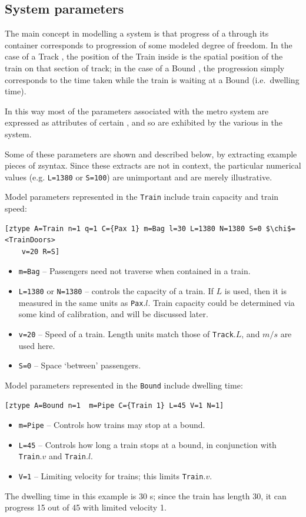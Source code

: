 \subsection{System parameters}
\label{modparams}
The main concept in modelling a system is that progress of a
 through its container corresponds to progression of some
modeled degree of freedom. In the case of a Track , the
position of the Train  inside is the spatial position of
the train on that section of track; in the case of a Bound
, the progression simply corresponds to the time taken
while the train is waiting at a Bound (i.e.~dwelling time).

In this way most of the parameters associated with the metro system are expressed
as attributes of certain , and so are exhibited by the
various  in the system.

Some of these parameters are shown and described below, by extracting
example pieces of zsyntax. Since these extracts are not in context,
the particular numerical values (e.g. {\tt L=1380} or {\tt S=100}) are
unimportant and are merely illustrative.

Model parameters represented in the {\tt Train}  include train capacity and train speed:
\begin{lstlisting}[mathescape]
  [ztype A=Train n=1 q=1 C={Pax 1} m=Bag l=30 L=1380 N=1380 S=0 $\chi$=<TrainDoors>
    v=20 R=S]
\end{lstlisting}
\begin{itemize}
\item {\tt m=Bag} -- Passengers need not traverse when contained in a train.
\item {\tt L=1380} or {\tt N=1380} -- controls the capacity of a
  train. If $L$ is used, then it is measured in the same units as {\tt Pax}.$l$.
  Train capacity could be determined via some kind of calibration, and will be discussed later.
\item {\tt v=20} -- Speed of a train. Length units match those of {\tt Track}.$L$, and $m/s$ are used here.
\item {\tt S=0} -- Space `between' passengers.
\end{itemize}

Model parameters represented in the {\tt Bound}  include dwelling time:
\begin{lstlisting}[mathescape]
  [ztype A=Bound n=1  m=Pipe C={Train 1} L=45 V=1 N=1]
\end{lstlisting}
\begin{itemize}
\item {\tt m=Pipe} -- Controls how trains may stop at a bound.
\item {\tt L=45} -- Controls how long a train stops at a bound, in conjunction with {\tt Train}.$v$ and {\tt Train}.$l$.
\item {\tt V=1} -- Limiting velocity for trains; this limits {\tt Train}.$v$.
\end{itemize}
The dwelling time in this example is 30 s; since the train has length 30, it can progress 15 out of 45 with limited velocity 1.

